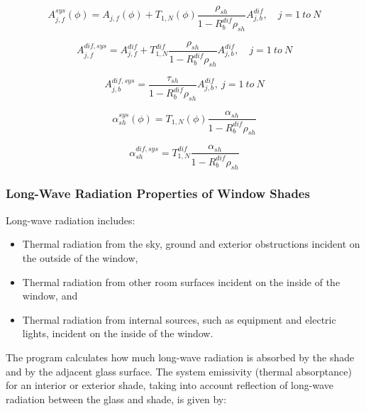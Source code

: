 \begin{equation}
A_{j,f}^{sys}(\phi ) = {A_{j,f}}(\phi ) + {T_{1,N}}(\phi )\frac{{{\rho_{sh}}}}{{1 - R_b^{dif}{\rho_{sh}}}}A_{j,b}^{dif},\quad j = 1~to~N
\end{equation}

\begin{equation}
A_{j,f}^{dif,sys} = A_{j,f}^{dif} + T_{1,N}^{dif}\frac{{{\rho_{sh}}}}{{1 - R_b^{dif}{\rho_{sh}}}}A_{j,b}^{dif},\quad j = 1~to~N
\end{equation}

\begin{equation}
A_{j,b}^{dif,sys} = \frac{{{\tau_{sh}}}}{{1 - R_b^{dif}{\rho_{sh}}}}A_{j,b}^{dif},{\mathrm{    }}~j = 1~to~N
\end{equation}

\begin{equation}
\alpha_{sh}^{sys}(\phi ) = T_{1,N}^{}(\phi )\frac{{{\alpha_{sh}}}}{{1 - R_b^{dif}{\rho_{sh}}}}
\end{equation}

\begin{equation}
\alpha_{sh}^{dif,sys} = T_{1,N}^{dif}\frac{{{\alpha_{sh}}}}{{1 - R_b^{dif}{\rho_{sh}}}}
\end{equation}

\subsubsection{Long-Wave Radiation Properties of Window Shades}\label{long-wave-radiation-properties-of-window-shades}

Long-wave radiation includes:

\begin{itemize}
\item Thermal radiation from the sky, ground and exterior obstructions incident on the outside of the window,
\item Thermal radiation from other room surfaces incident on the inside of the window, and
\item Thermal radiation from internal sources, such as equipment and electric lights, incident on the inside of the window.
\end{itemize}

The program calculates how much long-wave radiation is absorbed by the shade and by the adjacent glass surface. The system emissivity (thermal absorptance) for an interior or exterior shade, taking into account reflection of long-wave radiation between the glass and shade, is given by:

